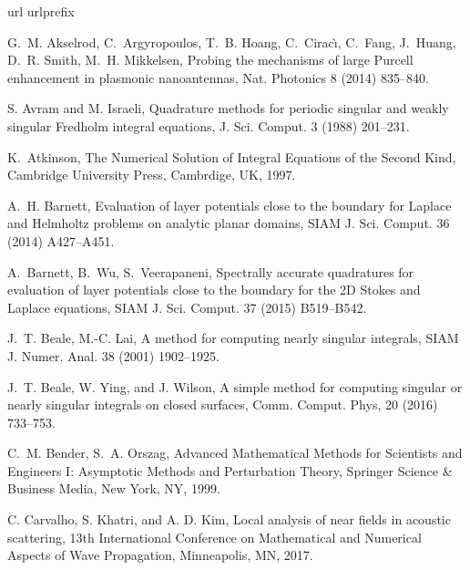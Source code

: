 \documentclass{article}[12pt]
\numberwithin{equation}{section}
\begin{document}
\begin{thebibliography}{10}

\expandafter\ifx\csname url\endcsname\relax
  \def\url#1{\texttt{#1}}\fi
\expandafter\ifx\csname urlprefix\endcsname\relax\def\urlprefix{URL }\fi

 G.~M. Akselrod, C.~Argyropoulos,
  T.~B. Hoang, C.~Cirac{\`\i}, C.~Fang, J.~Huang, D.~R. Smith,
  M.~H. Mikkelsen, Probing the mechanisms of large Purcell
  enhancement in plasmonic nanoantennas, Nat. Photonics 8 (2014)
  835--840.

 S. Avram and M. Israeli, Quadrature
  methods for periodic singular and weakly singular Fredholm integral
  equations, J. Sci. Comput. 3 (1988) 201--231.
  
 K.~Atkinson, The Numerical
  Solution of Integral Equations of the Second Kind,
  Cambridge University Press, Cambrdige, UK, 1997.

 A.~H. Barnett, Evaluation of layer
  potentials close to the boundary for Laplace and Helmholtz problems
  on analytic planar domains, SIAM J. Sci. Comput. 36 (2014)
  A427--A451.
  
   A.~Barnett, B.~Wu, S.~Veerapaneni,
  Spectrally accurate quadratures for evaluation of layer potentials
  close to the boundary for the 2D Stokes and Laplace equations, SIAM
  J. Sci. Comput. 37 (2015) B519--B542.

 J.~T. Beale, M.-C. Lai, A method for
  computing nearly singular integrals, SIAM J. Numer. Anal. 38 (2001)
  1902--1925.

 J.~T. Beale, W. Ying, and J. Wilson, A
  simple method for computing singular or nearly singular integrals on
  closed surfaces, Comm. Comput. Phys, 20 (2016) 733--753.

 C.~M. Bender, S.~A. Orszag, Advanced
  Mathematical Methods for Scientists and Engineers I: Asymptotic
  Methods and Perturbation Theory, Springer Science \& Business Media,
  New York, NY, 1999.


 C. Carvalho, S. Khatri, and A. D. Kim, Local
  analysis of near fields in acoustic scattering, 13th International
  Conference on Mathematical and Numerical Aspects of Wave
  Propagation, Minneapolis, MN, 2017.


\end{thebibliography}
\end{document}
